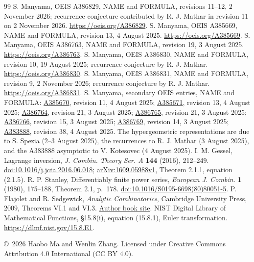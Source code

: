 \documentclass[11pt]{article}
\begin{document}
\begin{thebibliography}{99}
 S. Manyama, OEIS A386829, NAME and FORMULA,
revisions 11--12, 2 November 2026; recurrence conjecture contributed by
R. J. Mathar in revision 11 on 2 November 2026.
\url{https://oeis.org/A386829}.
 S. Manyama, OEIS A385669, NAME and FORMULA,
revision 13, 4 August 2025. \url{https://oeis.org/A385669}.
 S. Manyama, OEIS A386763, NAME and FORMULA,
revision 19, 3 August 2025. \url{https://oeis.org/A386763}.
 S. Manyama, OEIS A386830, NAME and FORMULA,
revision 10, 19 August 2025; recurrence conjecture by R. J. Mathar.
\url{https://oeis.org/A386830}.
 S. Manyama, OEIS A386831, NAME and FORMULA,
revision 9, 2 November 2026; recurrence conjecture by R. J. Mathar.
\url{https://oeis.org/A386831}.
 S. Manyama, secondary OEIS entries, NAME and FORMULA:
\href{https://oeis.org/A385670}{A385670}, revision 11, 4 August 2025;
\href{https://oeis.org/A385671}{A385671}, revision 13, 4 August 2025;
\href{https://oeis.org/A386764}{A386764}, revision 21, 3 August 2025;
\href{https://oeis.org/A386765}{A386765}, revision 21, 3 August 2025;
\href{https://oeis.org/A386766}{A386766}, revision 15, 3 August 2025;
\href{https://oeis.org/A386769}{A386769}, revision 14, 3 August 2025;
\href{https://oeis.org/A383888}{A383888}, revision 38, 4 August 2025.
The hypergeometric representations are due to S. Spezia (2--3 August 2025),
the recurrences to R. J. Mathar (3 August 2025), and the A383888 asymptotic
to V. Kotesovec (4 August 2025).
 I. M. Gessel, Lagrange inversion,
\emph{J. Combin. Theory Ser. A} \textbf{144} (2016), 212--249.
\href{https://doi.org/10.1016/j.jcta.2016.06.018}{doi:10.1016/j.jcta.2016.06.018};
\href{https://arxiv.org/abs/1609.05988}{arXiv:1609.05988v1},
Theorem 2.1.1, equation (2.1.5).
 R. P. Stanley, Differentiably finite power series,
\emph{European J. Combin.} \textbf{1} (1980), 175--188,
Theorem 2.1, p.~178.
\href{https://doi.org/10.1016/S0195-6698(80)80051-5}{doi:10.1016/S0195-6698(80)80051-5}.
 P. Flajolet and R. Sedgewick,
\emph{Analytic Combinatorics}, Cambridge University Press, 2009,
Theorems VI.1 and VI.3.
\href{https://ac.cs.princeton.edu/home/}{Author book site}.
 NIST Digital Library of Mathematical Functions,
\S15.8(i), equation (15.8.1), Euler transformation.
\href{https://dlmf.nist.gov/15.8.E1}{https://dlmf.nist.gov/15.8.E1}.
\end{thebibliography}
\bigskip\noindent\small
\copyright\ 2026 Haobo Ma and Wenlin Zhang.
Licensed under Creative Commons Attribution 4.0 International (CC BY 4.0).
\end{document}
